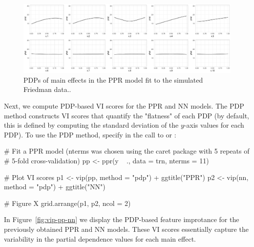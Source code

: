 
\begin{figure}[!htb]
  \centering 
  \includegraphics[width=1\linewidth]{figures/pdp-ppr} 
  \caption{PDPs of main effects in the PPR model fit to the simulated Friedman data..}
  \label{fig:pdp-ppr}
\end{figure}

Next, we compute PDP-based VI scores for the PPR and NN models. The PDP method constructs VI scores that quantify the "flatness" of each PDP (by default, this is defined by computing the standard deviation of the $y$-axis values for each PDP). To use the PDP method, specify  in the call to  or :

\begin{example}
# Fit a PPR model (nterms was chosen using the caret package with 5 repeats of 
# 5-fold cross-validation)
pp <- ppr(y ~ ., data = trn, nterms = 11)  

# Plot VI scores
p1 <- vip(pp, method = "pdp") + ggtitle("PPR")
p2 <- vip(nn, method = "pdp") + ggtitle("NN")

# Figure X
grid.arrange(p1, p2, ncol = 2)
\end{example}

In Figure~\ref{fig:vip-pp-nn} we display the PDP-based feature improtance for the previously obtained PPR and NN models. These VI scores essentially capture the variability in the partial dependence values for each main effect.

